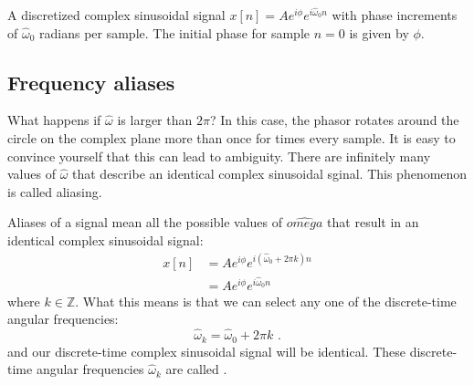 \begin{marginfigure}
\begin{center}
  \end{center}
  \caption{A discretized complex sinusoidal signal $x[n] = A e^{i\phi}e^{i\hat{\omega}_0n}$ 
  with phase increments of $\hat{\omega}_0$ radians per sample. The initial phase for sample $n=0$ is given by $\phi$.}
  \label{fig:rotating_dt_phasor}
\end{marginfigure}

\subsection{Frequency aliases}

What happens if $\hat{\omega}$ is larger than $2\pi$? In this case,
the phasor rotates around the circle on the complex plane more than
once for times every sample. It is easy to convince yourself that this
can lead to ambiguity. There are infinitely many values of
$\hat{\omega}$ that describe an identical complex sinusoidal
sginal. This phenomenon is called aliasing.

Aliases of a signal mean all the possible values of $\hat{omega}$ that
result in an identical complex sinusoidal signal:
\begin{align}
  x[n] & =Ae^{i\phi} e^{i(\hat{\omega}_0 + 2\pi k) n} \\
       & =Ae^{i\phi} e^{i \hat{\omega}_0  n}
\end{align}
where $k\in\mathbb{Z}$. What this means is that we can select any one
of the discrete-time angular frequencies:
\begin{equation}
  \boxed{
    \hat{\omega}_k = \hat{\omega}_0 + 2\pi k
  }\,\,.
\end{equation}
and our discrete-time complex sinusoidal signal will be
identical. These discrete-time angular frequencies $\hat{\omega}_k$
are called \emph{}.


